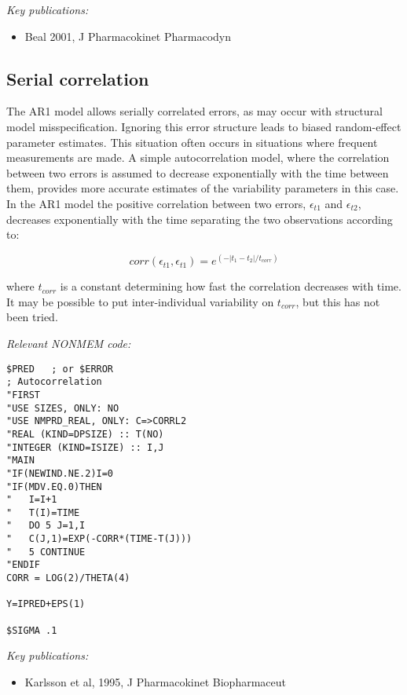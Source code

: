 \documentclass[a4paper,11pt]{article}
\begin{document}
\noindent \emph{Key publications:}
\begin{itemize}
\item Beal 2001, J Pharmacokinet Pharmacodyn
\end{itemize}

\subsection{Serial correlation}
The AR1 model allows serially correlated errors, as may occur with
structural model misspecification. Ignoring this error structure leads
to biased random-effect parameter estimates. This situation often
occurs in situations where frequent measurements are made. A simple
autocorrelation model, where the correlation between two errors is
assumed to decrease exponentially with the time between them, provides
more accurate estimates of the variability parameters in this case. In
the AR1 model the positive correlation between two errors,
$\epsilon_{t1}$ and $\epsilon_{t2}$, decreases exponentially with the
time separating the two observations according to:

\begin{equation}
corr(\epsilon_{t1}, \epsilon_{t1}) = e^{(- \left| t_1 - t_2
\right|/t_{corr})}
\end{equation}

\noindent where $t_{corr}$ is a constant determining how fast the
correlation decreases with time. It may be possible to put
inter-individual variability on $t_{corr}$, but this has not been
tried.

\vspace{10pt}

\noindent \emph{Relevant NONMEM code:}
\begin{lstlisting}
$PRED   ; or $ERROR
; Autocorrelation
"FIRST
"USE SIZES, ONLY: NO
"USE NMPRD_REAL, ONLY: C=>CORRL2
"REAL (KIND=DPSIZE) :: T(NO)
"INTEGER (KIND=ISIZE) :: I,J
"MAIN
"IF(NEWIND.NE.2)I=0
"IF(MDV.EQ.0)THEN
"   I=I+1
"   T(I)=TIME
"   DO 5 J=1,I
"   C(J,1)=EXP(-CORR*(TIME-T(J)))
"   5 CONTINUE
"ENDIF
CORR = LOG(2)/THETA(4)

Y=IPRED+EPS(1)

$SIGMA .1
\end{lstlisting}


\noindent \emph{Key publications:}
\begin{itemize}
\item Karlsson et al, 1995, J Pharmacokinet Biopharmaceut
\end{itemize}
\end{document}
